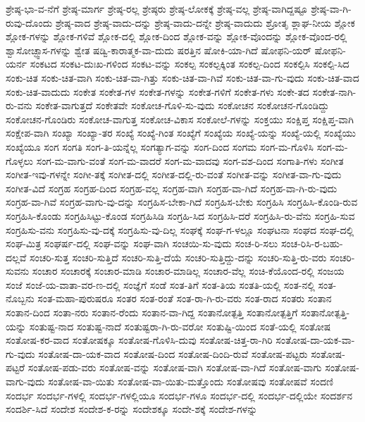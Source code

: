 {ಶ್ರೇಷ್ಠ-ಭಾ-ವ-ನೆಗೆ
ಶ್ರೇಷ್ಠ-ಮಾರ್ಗ
ಶ್ರೇಷ್ಠ-ರಲ್ಲ
ಶ್ರೇಷ್ಠರು
ಶ್ರೇಷ್ಠ-ಲೋಕಕ್ಕೆ
ಶ್ರೇಷ್ಠ-ವಲ್ಲ
ಶ್ರೇಷ್ಠ-ವಾಗಿದ್ದಷ್ಟೂ
ಶ್ರೇಷ್ಠ-ವಾ-ಗಿ-ರುವು-ದೊಂದು
ಶ್ರೇಷ್ಠ-ವಾದ
ಶ್ರೇಷ್ಠ-ವಾದು-ದನ್ನು
ಶ್ರೇಷ್ಠ-ವಾದು-ದನ್ನೇ
ಶ್ರೇಷ್ಠ-ವಾದುದು
ಶ್ರೋತೃ
ಶ್ಲಾಘ-ನೀಯ
ಶ್ಲೋಕ
ಶ್ಲೋಕ-ಗಳನ್ನು
ಶ್ಲೋಕ-ಗಳಿವೆ
ಶ್ಲೋಕ-ದಲ್ಲಿ
ಶ್ಲೋಕ-ದಿಂದ
ಶ್ಲೋಕ-ವನ್ನು
ಶ್ಲೋಕ-ವೊಂದನ್ನು
ಶ್ಲೋಕ-ವೊಂದ-ರಲ್ಲಿ
ಶ್ವಾಸೋಚ್ಫ್ವಾಸ-ಗಳನ್ನು
ಶ್ವೇತ
ಷಡ್ವಿ-ಕಾರಾತ್ಮಕ-ವಾ-ದುದು
ಷರತ್ತಿನ
ಷೋಕಿ-ಯಾ-ಗಿದೆ
ಷೋಫನಿ-ಯರ್
ಷೋಫನಿ-ಯರ್ನ
ಸಂಕಟದ
ಸಂಕಟ-ದುಃಖ-ಗಳಿಂದ
ಸಂಕಟ-ವನ್ನು
ಸಂಕಲ್ಪ
ಸಂಕಲ್ಪಕ್ಕಿಂತ
ಸಂಕಲ್ಪ-ದಿಂದ
ಸಂಕಲ್ಪಿಸಿ
ಸಂಕಲ್ಪಿ-ಸಿದ
ಸಂಕು-ಚಿತ
ಸಂಕು-ಚಿತ-ವಾಗಿ
ಸಂಕು-ಚಿತ-ವಾ-ಗಿತ್ತು
ಸಂಕು-ಚಿತ-ವಾ-ಗಿವೆ
ಸಂಕು-ಚಿತ-ವಾ-ಗು-ವುದು
ಸಂಕು-ಚಿತ-ವಾದ
ಸಂಕು-ಚಿತ-ವಾದುದು
ಸಂಕೇತ
ಸಂಕೇತ-ಗಳ
ಸಂಕೇತ-ಗಳನ್ನು
ಸಂಕೇತ-ಗಳಿಗೆ
ಸಂಕೇತ-ಗಳು
ಸಂಕೇ-ತದ
ಸಂಕೇತ-ನಾಗಿ-ರು-ವನು
ಸಂಕೇತ-ವಾಗುತ್ತದೆ
ಸಂಕೇತವೇ
ಸಂಕೋಚ-ಗೊಳಿ-ಸು-ವುದು
ಸಂಕೋಚನ
ಸಂಕೋಚನ-ಗೊಂಡಿದ್ದು
ಸಂಕೋಚನ-ಗೊಂಡಿರು
ಸಂಕೋಚ-ವಾಗುತ್ತ
ಸಂಕೋಚ-ವಿಕಾಸ
ಸಂಕೋಲೆ-ಗಳನ್ನು
ಸಂಕ್ತಯು
ಸಂಕ್ಷಿಪ್ತ
ಸಂಕ್ಷಿಪ್ತ-ವಾಗಿ
ಸಂಕ್ಷೇಪ-ವಾಗಿ
ಸಂಖ್ಯಾ
ಸಂಖ್ಯಾ-ತರ
ಸಂಖ್ಯೆ
ಸಂಖ್ಯೆ-ಗಿಂತ
ಸಂಖ್ಯೆಗೆ
ಸಂಖ್ಯೆಯ
ಸಂಖ್ಯೆ-ಯನ್ನು
ಸಂಖ್ಯೆ-ಯಲ್ಲಿ
ಸಂಖ್ಯೆಯು
ಸಂಖ್ಯೆಯೂ
ಸಂಗ
ಸಂಗತಿ
ಸಂಗ-ತಿ-ಯನ್ನೆಲ್ಲ
ಸಂಗತ್ಯಾಗ-ವನ್ನು
ಸಂಗ-ದಿಂದ
ಸಂಗಮ
ಸಂಗ-ಮ-ಗೊಳಿಸಿ
ಸಂಗ-ಮ-ಗೊಳ್ಳಲು
ಸಂಗ-ಮ-ವಾಗು-ವಂತೆ
ಸಂಗ-ಮ-ವಾದರೆ
ಸಂಗ-ಮ-ವಾದವು
ಸಂಗ-ವಶ-ದಿಂದ
ಸಂಗಾತಿ-ಗಳು
ಸಂಗೀತ
ಸಂಗೀತ-ಇವು-ಗಳನ್ನೇ
ಸಂಗೀ-ತಕ್ಕೆ
ಸಂಗೀತ-ದಲ್ಲಿ
ಸಂಗೀತ-ದಲ್ಲಿ-ರು-ವಂತೆ
ಸಂಗೀತ-ವನ್ನು
ಸಂಗೀತ-ವಾ-ಗು-ವುದು
ಸಂಗೀತ-ವಿದೆ
ಸಂಗ್ರಹ
ಸಂಗ್ರಹ-ದಿಂದ
ಸಂಗ್ರಹ-ವಲ್ಲ
ಸಂಗ್ರಹ-ವಾಗಿ
ಸಂಗ್ರಹ-ವಾ-ಗಿದೆ
ಸಂಗ್ರಹ-ವಾ-ಗಿ-ರು-ವುದು
ಸಂಗ್ರಹ-ವಾ-ಗಿವೆ
ಸಂಗ್ರಹ-ವಾಗು-ವು-ದನ್ನು
ಸಂಗ್ರಹಿಸ-ಬೇಕಾ-ಗಿದೆ
ಸಂಗ್ರಹಿಸ-ಬೇಕು
ಸಂಗ್ರಹಿಸಿ
ಸಂಗ್ರಹಿಸಿ-ಕೊಂಡಿ-ರುವ
ಸಂಗ್ರಹಿಸಿ-ಕೊಂಡು
ಸಂಗ್ರಹಿಸಿಟ್ಟು-ಕೊಂಡ
ಸಂಗ್ರಹಿಸಿಡಿ
ಸಂಗ್ರಹಿ-ಸಿದ
ಸಂಗ್ರಹಿಸಿ-ದರೆ
ಸಂಗ್ರಹಿಸಿ-ರು-ವೆನು
ಸಂಗ್ರಹಿ-ಸುವ
ಸಂಗ್ರಹಿಸು-ವನು
ಸಂಗ್ರಹಿಸು-ವು-ದಕ್ಕೆ
ಸಂಗ್ರಹಿಸು-ವು-ದಿಲ್ಲ
ಸಂಘಕ್ಕೆ
ಸಂಘ-ಗ-ಳಲ್ಲೂ
ಸಂಘಟನಾ
ಸಂಘದ
ಸಂಘ-ದಲ್ಲಿ
ಸಂಘ-ಮಿತ್ರ
ಸಂಘರ್ಷ-ದಲ್ಲಿ
ಸಂಘ-ವನ್ನು
ಸಂಘ-ವಾಗಿ
ಸಂಚಯಿ-ಸು-ವುದು
ಸಂಚ-ರಿ-ಸಲು
ಸಂಚ-ರಿಸಿ-ರ-ಬಹು-ದಲ್ಲವೆ
ಸಂಚರಿ-ಸುತ್ತ
ಸಂಚರಿ-ಸುತ್ತಿದೆ
ಸಂಚರಿ-ಸುತ್ತಿ-ದೆಯೆ
ಸಂಚರಿ-ಸುತ್ತಿದ್ದು-ದನ್ನು
ಸಂಚರಿ-ಸುತ್ತಿ-ರು-ವರು
ಸಂಚರಿ-ಸುವನು
ಸಂಚಾರ
ಸಂಚಾರಕ್ಕೆ
ಸಂಚಾರ-ಮಾಡಿ
ಸಂಚಾರ-ಮಾಡಿಲ್ಲ
ಸಂಚಾರ-ವೆಲ್ಲ
ಸಂಚಿ-ಕೆಯೊಂದ-ರಲ್ಲಿ
ಸಂಜಯ
ಸಂಜೆ
ಸಂಜೆ-ಯ-ವಾತಾ-ವರ-ಣ-ದಲ್ಲಿ
ಸಂಜ್ಞೆಗೆ
ಸಂಡೆ
ಸಂತ-ತಿಗೆ
ಸಂತ-ತಿಯ
ಸಂತತಿ-ಯಲ್ಲಿ
ಸಂತ-ನಲ್ಲಿ
ಸಂತ-ನೊಬ್ಬನು
ಸಂತ-ಮಹಾ-ಪುರುಷರೂ
ಸಂತರ
ಸಂತ-ರಂತೆ
ಸಂತ-ರಾ-ಗಿ-ರು-ವರು
ಸಂತ-ರಾದ
ಸಂತರು
ಸಂತಾನ
ಸಂತಾನ-ದಿಂದ
ಸಂತಾ-ನರು
ಸಂತಾನ-ರೆಂದು
ಸಂತಾನ-ವಾ-ಗಿದ್ದ
ಸಂತಾನೋತ್ಪತ್ತಿ
ಸಂತಾನೋತ್ಪತ್ತಿಗೆ
ಸಂತಾನೋತ್ಪತ್ತಿ-ಯನ್ನು
ಸಂತುಷ್ಟ-ನಾದ
ಸಂತುಷ್ಟ-ನಾದೆ
ಸಂತುಷ್ಟರಾ-ಗಿ-ರು-ವರೋ
ಸಂತುಷ್ಟಿ-ಯಿಂದ
ಸಂತೆ-ಯಲ್ಲಿ
ಸಂತೋಷ
ಸಂತೋಷ-ಕರ-ವಾದ
ಸಂತೋಷಕ್ಕೂ
ಸಂತೋಷ-ಗೊಳಿಸಿ-ದುವು
ಸಂತೋಷ-ಚಿತ್ತ-ರಾ-ಗಿರಿ
ಸಂತೋಷ-ದಾ-ಯಕ-ವಾ-ಗು-ವುದು
ಸಂತೋಷ-ದಾ-ಯಕ-ವಾದ
ಸಂತೋಷ-ದಿಂದ
ಸಂತೋಷ-ದಿಂದಿ-ರುವೆ
ಸಂತೋಷ-ಪಟ್ಟರು
ಸಂತೋಷ-ಪಟ್ಟರೆ
ಸಂತೋಷ-ಪಡು-ವರು
ಸಂತೋಷ-ವನ್ನು
ಸಂತೋಷ-ವಾಗಿ
ಸಂತೋಷ-ವಾ-ಗಿದೆ
ಸಂತೋಷ-ವಾಗು
ಸಂತೋಷ-ವಾಗು-ವುದು
ಸಂತೋಷ-ವಾ-ಯಿತು
ಸಂತೋಷ-ವಾ-ಯಿತು-ಮತ್ತೊಂದು
ಸಂತೋಷವು
ಸಂತೋಷವೆ
ಸಂದಣಿ
ಸಂದರ್ಭ
ಸಂದರ್ಭ-ಗಳಲ್ಲಿ
ಸಂದರ್ಭ-ಗಳಲ್ಲಿಯೂ
ಸಂದರ್ಭ-ಗಳೂ
ಸಂದರ್ಭ-ದಲ್ಲಿ
ಸಂದರ್ಭ-ದಲ್ಲಿಯೇ
ಸಂದರ್ಶನ
ಸಂದರ್ಶಿ-ಸಿದೆ
ಸಂದೇಶ
ಸಂದೇಶ-ಕ-ರನ್ನು
ಸಂದೇಶಕ್ಕೂ
ಸಂದೇ-ಶಕ್ಕೆ
ಸಂದೇಶ-ಗಳನ್ನು
}
